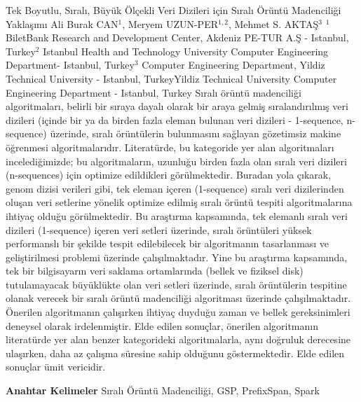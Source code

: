 
    \begin{abstract_online}{Tek Boyutlu, Sıralı, Büyük Ölçekli Veri Dizileri için Sıralı Örüntü Madenciliği Yaklaşımı}{%
        Ali Burak CAN$^{1}$, Meryem UZUN-PER$^{1,2}$, Mehmet S. AKTAŞ$^{3}$}{%
        }{%
        $^1$ BiletBank Research and Development Center, Akdeniz PE-TUR A.Ş - Istanbul, Turkey\newline{}$^2$ Istanbul Health and Technology University Computer Engineering Department- Istanbul, Turkey\newline{}$^3$ Computer Engineering Department, Yildiz Technical University - Istanbul, TurkeyYildiz Technical University Computer Engineering Department - Istanbul, Turkey}
    Sıralı örüntü madenciliği algoritmaları, belirli bir sıraya dayalı olarak bir araya gelmiş sıralandırılmış veri dizileri (içinde bir ya da birden fazla eleman bulunan veri dizileri - 1-sequence, n-sequence) üzerinde, sıralı örüntülerin bulunmasını sağlayan gözetimsiz makine öğrenmesi algoritmalarıdır. Literatürde, bu kategoride yer alan algoritmaları incelediğimizde; bu algoritmaların, uzunluğu birden fazla olan sıralı veri dizileri (n-sequences) için optimize edildikleri görülmektedir. Buradan yola çıkarak, genom dizisi verileri gibi, tek eleman içeren (1-sequence) sıralı veri dizilerinden oluşan veri setlerine yönelik optimize edilmiş sıralı örüntü tespiti algoritmalarına ihtiyaç olduğu görülmektedir. Bu araştırma kapsamında, tek elemanlı sıralı veri dizileri (1-sequence) içeren veri setleri üzerinde, sıralı örüntüleri yüksek performanslı bir şekilde tespit edilebilecek bir algoritmanın tasarlanması ve geliştirilmesi problemi üzerinde çalışılmaktadır. Yine bu araştırma kapsamında, tek bir bilgisayarın veri saklama ortamlarında (bellek ve fiziksel disk) tutulamayacak büyüklükte olan veri setleri üzerinde, sıralı örüntülerin tespitine olanak verecek bir sıralı örüntü madenciliği algoritması üzerinde çalışılmaktadır. Önerilen algoritmanın çalışırken ihtiyaç duyduğu zaman ve bellek gereksinimleri deneysel olarak irdelenmiştir. Elde edilen sonuçlar, önerilen algoritmanın literatürde yer alan benzer kategorideki algoritmalarla, aynı doğruluk derecesine ulaşırken, daha az çalışma süresine sahip olduğunu göstermektedir. Elde edilen sonuçlar ümit vericidir. 
    
            \textbf{Anahtar Kelimeler} \newline{}Sıralı Örüntü Madenciliği, GSP, PrefixSpan, Spark
    \end{abstract_online}
    